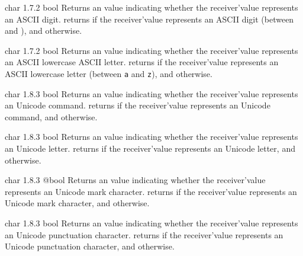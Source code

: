 {char}
{1.7.2}
{bool}
{Returns an  value indicating whether the receiver'value represents an ASCII digit.}
{returns  if the receiver'value represents an ASCII digit (between \texttt{\textquotesingle} and \texttt{\textquotesingle}), and  otherwise.}





{char}
{1.7.2}
{bool}
{Returns an  value indicating whether the receiver'value represents an ASCII lowercase ASCII letter.}
{returns  if the receiver'value represents an ASCII lowercase letter (between \texttt{\textquotesingle a\textquotesingle} and \texttt{\textquotesingle z\textquotesingle}), and  otherwise.}






{char}
{1.8.3}
{bool}
{Returns an  value indicating whether the receiver'value represents an Unicode command.}
{returns  if the receiver'value represents an Unicode command, and  otherwise.}






{char}
{1.8.3}
{bool}
{Returns an  value indicating whether the receiver'value represents an Unicode letter.}
{returns  if the receiver'value represents an Unicode letter, and  otherwise.}






{char}
{1.8.3}
{@bool}
{Returns an  value indicating whether the receiver'value represents an Unicode mark character.}
{returns  if the receiver'value represents an Unicode mark character, and  otherwise.}






{char}
{1.8.3}
{bool}
{Returns an  value indicating whether the receiver'value represents an Unicode punctuation character.}
{returns  if the receiver'value represents an Unicode punctuation character, and  otherwise.}






